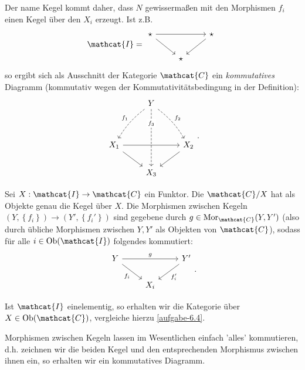 \begin{dremark}
    Der name Kegel kommt daher, dass $N$ gewissermaßen mit den Morphismen  $f_i$ einen Kegel über den  $X_i$ erzeugt. Ist z.B.
     \[
         \mathcat{I} = 
    \begin{tikzcd}
        \star \ar{rr} \ar{dr} & & \star \ar{dl} \\
                              & \star
    \end{tikzcd}
\]
so ergibt sich als Ausschnitt der Kategorie $\mathcat{C}$ ein \textit{kommutatives} Diagramm (kommutativ wegen der Kommutativitätsbedingung in der Definition):
\[
\begin{tikzcd}
    & Y\ar[bend right = 10, dashed,swap]{ddl}{f_1} \ar[dashed, "f_3" description, near start]{ddd} \ar[bend left = 10, dashed]{ddr}{f_2} \\
    \\
    X_1 \ar{dr}\ar{rr} & & X_2 \ar{dl}\\
                & X_3
\end{tikzcd}
.\]

\end{dremark}

\begin{definition}[Kegelkategorie]\label{def:kegelkategorie}
    Sei $X: \mathcat{I} \to  \mathcat{C}$ ein Funktor. Die  $\mathcat{C} / X$ hat als Objekte genau die Kegel über $X$. Die Morphismen zwischen Kegeln $(Y, \left \{f_i\right\}) \to (Y', \left \{f_i'\right\} )$ sind gegebene durch $g\in \Mor_{\mathcat{C}}(Y,Y')$ (also durch übliche Morphismen zwischen $Y,Y'$ als Objekten von  $\mathcat{C}$), sodass für alle $i\in \Ob(\mathcat{I})$ folgendes kommutiert:
    \[
    \begin{tikzcd}
        Y \ar{rr}{g} \ar[swap]{dr}{f_i} & & Y' \ar{dl}{f_i'} \\
                                        & X_i
    \end{tikzcd}
    .\] 
\end{definition}

\begin{oral}
    Ist $\mathcat{I}$ einelementig, so erhalten wir die Kategorie über  $X\in \Ob(\mathcat{C})$, vergleiche hierzu \autoref{aufgabe-6.4}.
\end{oral}

\begin{remark*}
    Morphismen zwischen Kegeln lassen im Wesentlichen einfach 'alles' kommutieren, d.h. zeichnen wir die beiden Kegel und den entsprechenden Morphismus zwischen ihnen ein, so erhalten wir ein kommutatives Diagramm.
\end{remark*}


